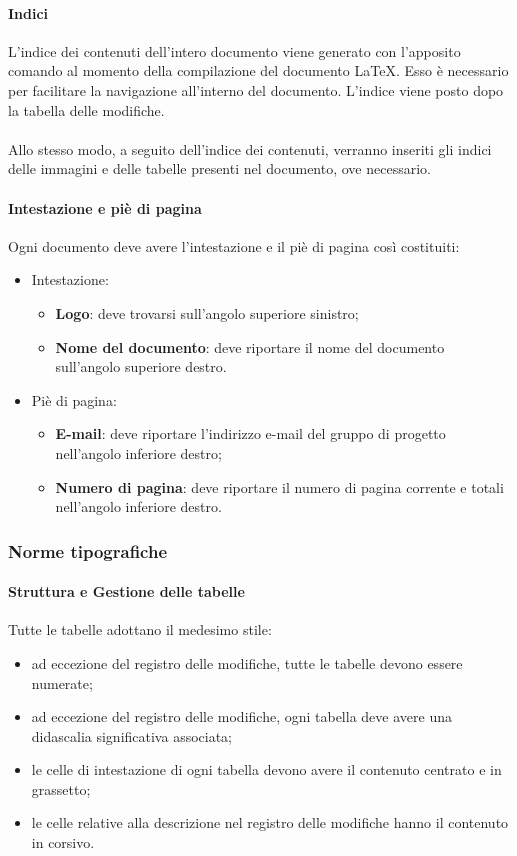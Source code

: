  \paragraph{Indici}
  L'indice dei contenuti dell'intero documento viene generato con l'apposito comando al momento della compilazione
  del documento \LaTeX. Esso è necessario per facilitare la navigazione all'interno del
  documento. L'indice viene posto dopo la tabella delle modifiche.\\\\
  Allo stesso modo, a seguito dell'indice dei contenuti, verranno inseriti gli indici delle immagini e delle tabelle presenti nel documento, ove necessario.

	  \paragraph{Intestazione e piè di pagina}
	Ogni documento deve avere l'intestazione e il piè di pagina così costituiti:
	\begin{itemize}
		\item Intestazione:
		\begin{itemize}
			\item \textbf{Logo}: deve trovarsi sull'angolo superiore sinistro;
			\item \textbf{Nome del documento}: deve riportare il nome del documento sull'angolo superiore destro.
		\end{itemize}
		\item Piè di pagina:
		\begin{itemize}
			\item \textbf{E-mail}: deve riportare l'indirizzo e-mail del gruppo di progetto
			nell'angolo inferiore destro;
			\item \textbf{Numero di pagina}: deve riportare il numero di pagina corrente e totali
			nell'angolo inferiore destro.
		\end{itemize}
	\end{itemize}
	

  \subsubsection{Norme tipografiche}

  \paragraph{Struttura e Gestione delle tabelle}
  Tutte le tabelle adottano il medesimo stile:
  \begin{itemize}
  	\item ad eccezione del registro delle modifiche, tutte le tabelle devono essere numerate;
  	\item ad eccezione del registro delle modifiche, ogni tabella deve avere una didascalia significativa associata;
  	\item le celle di intestazione di ogni tabella devono avere il contenuto centrato e in grassetto;
  	\item le celle relative alla descrizione nel registro delle modifiche hanno il contenuto in corsivo.
  \end{itemize}

